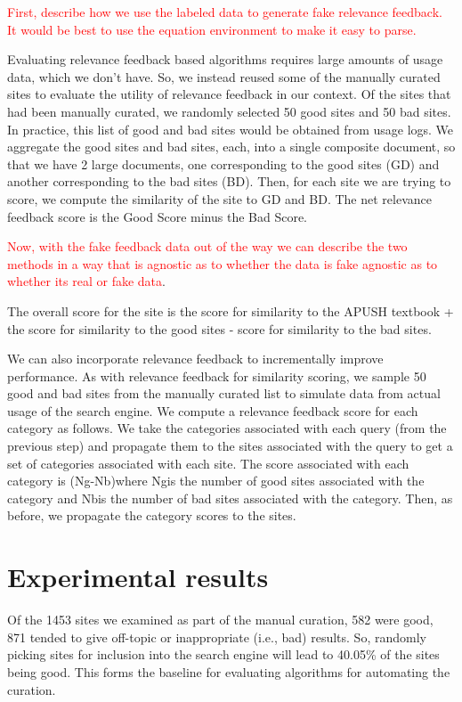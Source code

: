 \documentclass{acm_proc_article-sp}
\begin{document}
\textcolor{red}{First, describe how we use the labeled data to generate fake
  relevance feedback. It would be best to use the equation environment to make
  it easy to parse. }

Evaluating relevance feedback based algorithms requires large amounts of usage
data, which we don't have. So, we instead reused some of the manually curated
sites to evaluate the utility of relevance feedback in our context. Of the sites
that had been manually curated, we randomly selected 50 good sites and 50 bad
sites. In practice, this list of good and bad sites would be obtained from usage
logs. We aggregate the good sites and bad sites, each, into a single composite
document, so that we have 2 large documents, one corresponding to the good sites
(GD) and another corresponding to the bad sites (BD). Then, for each site we are
trying to score, we compute the similarity of the site to GD and BD. The net
relevance feedback score is the Good Score minus the Bad Score. 

\textcolor{red}{Now, with the fake feedback data out of the way we can describe
  the two methods in a way that is agnostic as to whether the data is fake
  agnostic as to whether its real or fake data}. 

The overall score for the site is the score for similarity to the APUSH textbook + the score
for similarity to the good sites - score for similarity to the bad sites. 

We can also incorporate relevance feedback to incrementally improve
performance. As with relevance feedback for similarity scoring, we sample 50
good and bad sites from the manually curated list to simulate data from actual
usage of the search engine. We compute a relevance feedback score for each
category as follows. We take the categories associated with each query (from the
previous step) and propagate them to the sites associated with the query to get
a set of categories associated with each site. The score associated with each
category is (Ng-Nb)where Ngis the number of good sites associated with the
category and Nbis the number of bad sites associated with the category. Then, as
before, we propagate the category scores to the sites.  

\section{Experimental results}

Of the 1453 sites we examined as part of the manual curation, 582 were good, 871
tended to give off-topic or inappropriate (i.e., bad) results. So, randomly
picking sites for inclusion into the search engine will lead to 40.05\% of the
sites being good. This forms the baseline for evaluating algorithms for
automating the curation. 
\end{document}
